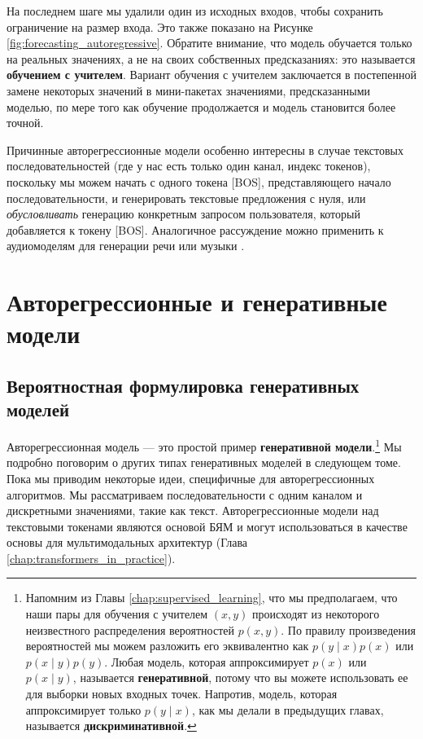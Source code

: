 На последнем шаге мы удалили один из исходных входов, чтобы сохранить ограничение на размер входа. Это также показано на Рисунке \ref{fig:forecasting_autoregressive}. Обратите внимание, что модель обучается только на реальных значениях, а не на своих собственных предсказаниях: это называется \textbf{обучением с учителем}. Вариант обучения с учителем заключается в постепенной замене некоторых значений в мини-пакетах значениями, предсказанными моделью, по мере того как обучение продолжается и модель становится более точной. 

Причинные авторегрессионные модели особенно интересны в случае текстовых последовательностей (где у нас есть только один канал, индекс токенов), поскольку мы можем начать с одного токена [BOS], представляющего начало последовательности, и генерировать текстовые предложения с нуля, или \textit{обусловливать} генерацию конкретным запросом пользователя, который добавляется к токену [BOS]. Аналогичное рассуждение можно применить к аудиомоделям для генерации речи или музыки \cite{oord2016wavenet}.

\section{Авторегрессионные и генеративные модели}
\subsection{Вероятностная формулировка генеративных моделей}
\label{subsec:probabilistic_formulation_generative_models} \addteacup

Авторегрессионная модель — это простой пример \textbf{генеративной модели}.\footnote{Напомним из Главы \ref{chap:supervised_learning}, что мы предполагаем, что наши пары для обучения с учителем $(x,y)$ происходят из некоторого неизвестного распределения вероятностей $p(x,y)$. По правилу произведения вероятностей мы можем разложить его эквивалентно как $p(y \mid x)p(x)$ или $p(x \mid y)p(y)$. Любая модель, которая аппроксимирует $p(x)$ или $p(x \mid y)$, называется \textbf{генеративной}, потому что вы можете использовать ее для выборки новых входных точек. Напротив, модель, которая аппроксимирует только $p(y \mid x)$, как мы делали в предыдущих главах, называется \textbf{дискриминативной}.} Мы подробно поговорим о других типах генеративных моделей в следующем томе. Пока мы приводим некоторые идеи, специфичные для авторегрессионных алгоритмов. Мы рассматриваем последовательности с одним каналом и дискретными значениями, такие как текст. Авторегрессионные модели над текстовыми токенами являются основой БЯМ и могут использоваться в качестве основы для мультимодальных архитектур (Глава \ref{chap:transformers_in_practice}).

